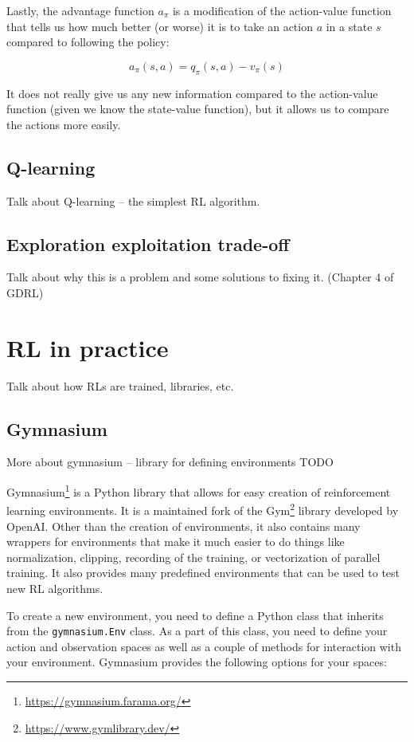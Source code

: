 \documentclass[
  digital,     %
  oneside,     %
  nosansbold,  %
  nocolorbold, %
  lof,         %
  lot,         %
]{fithesis4}
\begin{document}
Lastly, the advantage function $a_\pi$ is a modification of the action-value function that tells us how much better (or worse) it is to take an action $a$ in a state $s$ compared to following the policy:

\[
a_\pi(s,a) = q_\pi(s,a)-v_\pi(s)
\]

It does not really give us any new information compared to the action-value function (given we know the state-value function), but it allows us to compare the actions more easily.

\section{Q-learning}
Talk about Q-learning -- the simplest RL algorithm.

\section{Exploration exploitation trade-off}
Talk about why this is a problem and some solutions to fixing it. (Chapter 4 of GDRL)

\chapter{RL in practice}
Talk about how RLs are trained, libraries, etc.

\section{Gymnasium}
\label{section:gym}
More about gymnasium -- library for defining environments TODO

Gymnasium\footnote{\url{https://gymnasium.farama.org/}} is a Python library that allows for easy creation of reinforcement learning environments. It is a maintained fork of the Gym\footnote{\url{https://www.gymlibrary.dev/}} library developed by OpenAI. Other than the creation of environments, it also contains many wrappers for environments that make it much easier to do things like normalization, clipping, recording of the training, or vectorization of parallel training. It also provides many predefined environments that can be used to test new RL algorithms.

To create a new environment, you need to define a Python class that inherits from the \verb|gymnasium.Env| class. As a part of this class, you need to define your action and observation spaces as well as a couple of methods for interaction with your environment. Gymnasium provides the following options for your spaces:
\end{document}
